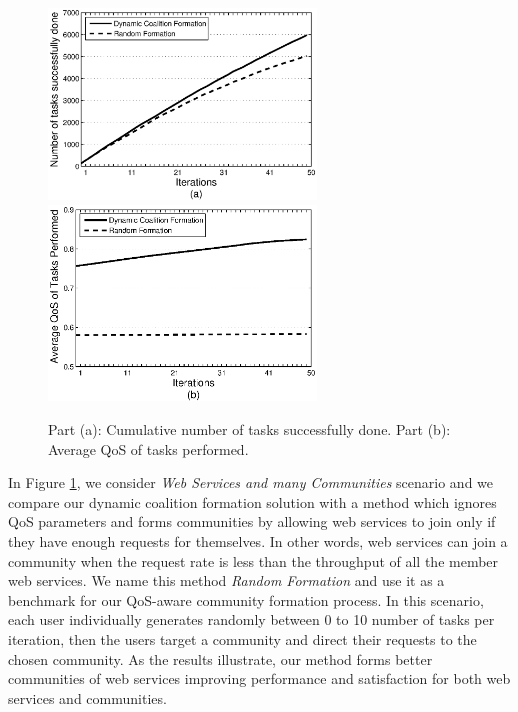 \begin{figure}%
\centering
\includegraphics[width=2.8in]{s2_task_done.eps}
\includegraphics[width=2.8in]{s2_task_qos.eps}
\caption{Part (a): Cumulative number of tasks successfully done.
Part (b): Average QoS of tasks performed.} \label{performancemany}
\end{figure}


In Figure \ref{performancemany}, we consider \emph{Web Services
and many Communities} scenario and we compare our dynamic
coalition formation solution with a method which ignores QoS
parameters and forms communities by allowing web services to join
only if they have enough requests for themselves. In other words,
web services can join a community when the request rate is less
than the throughput of all the member web services. We name this
method \emph{Random Formation} and use it as a benchmark for our
QoS-aware community formation process. In this scenario, each user
individually generates randomly between 0 to 10 number of tasks
per iteration, then the users target a community and direct their
requests to the chosen community. As the results illustrate, our
method forms better communities of web services improving
performance and satisfaction for both web services and
communities.

